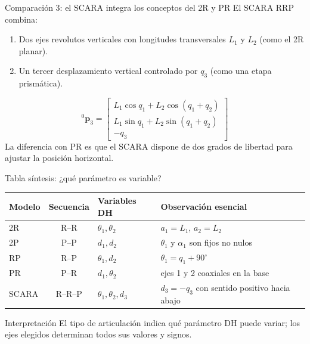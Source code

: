 \documentclass[aspectratio=169,11pt]{beamer}
\begin{document}
\begin{frame}[t]{Comparación 3: el SCARA integra los conceptos del 2R y PR}
 \small
 El SCARA RRP combina:\vspace{0.08cm}
 \begin{enumerate}
  \item Dos ejes revolutos verticales con longitudes
        transversales $L_1$ y $L_2$ (como el 2R planar).
  \item Un tercer desplazamiento vertical controlado
        por $q_3$ (como una etapa prismática).
 \end{enumerate}
 \pause
 \[
 \boxed{{}^0\mathbf p_3=
 \begin{bmatrix}
 L_1\cos q_1+L_2\cos(q_1+q_2)\\
 L_1\sin q_1+L_2\sin(q_1+q_2)\\
 -q_3
 \end{bmatrix}}
 \]
 \small La diferencia con PR es que el SCARA dispone de
 dos grados de libertad para ajustar la posición horizontal.
\end{frame}

\begin{frame}[t]{Tabla síntesis: ¿qué parámetro es variable?}
 \small
 \begin{tabular}{lclp{5.2cm}}
 \toprule
 Modelo & Secuencia & Variables DH & Observación esencial\\\midrule
 2R & R--R & $\theta_1,\theta_2$ & $a_1=L_1$, $a_2=L_2$\\
 2P & P--P & $d_1,d_2$ & $\theta_1$ y $\alpha_1$ son fijos no nulos\\
 RP & R--P & $\theta_1,d_2$ & $\theta_1=q_1+90^\circ$\\
 PR & P--R & $d_1,\theta_2$ & ejes 1 y 2 coaxiales en la base\\
 SCARA & R--R--P & $\theta_1,\theta_2,d_3$ & $d_3=-q_3$ con sentido positivo hacia abajo\\
 \bottomrule
 \end{tabular}
 \pause
 \vspace{0.22cm}
 \begin{block}{Interpretación}
 El tipo de articulación indica qué parámetro DH puede variar;
 los ejes elegidos determinan todos sus valores y signos.
 \end{block}
\end{frame}
\end{document}
